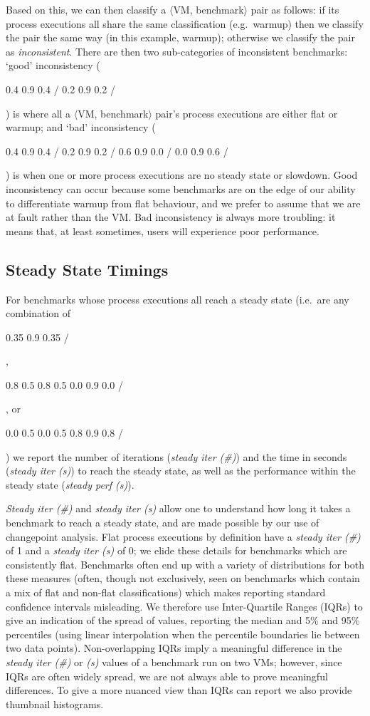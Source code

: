 \documentclass[acmsmall,screen]{acmart}
\newcommand{\vmbpair}{$\langle$VM, benchmark$\rangle$\xspace}
\DeclareRobustCommand{\flatc}{%
\setlength{\sparklinethickness}{0.4pt}%
\begin{sparkline}{1.5}
\spark 0.1 0.35
       0.9 0.35
       /%
\end{sparkline}\xspace%
}
\DeclareRobustCommand{\warmup}{%
\setlength{\sparklinethickness}{0.4pt}%
\begin{sparkline}{1.5}
\spark 0.1 0.8
       0.5 0.8
       0.5 0.0
       0.9 0.0
       /%
\end{sparkline}\xspace%
}
\DeclareRobustCommand{\slowdown}{%
\setlength{\sparklinethickness}{0.4pt}%
\begin{sparkline}{1.5}
\spark 0.1 0.0
       0.5 0.0
       0.5 0.8
       0.9 0.8
       /%
\end{sparkline}\xspace%
}
\DeclareRobustCommand{\badinconsistent}{%
\setlength{\sparklinethickness}{0.4pt}%
\begin{sparkline}{1.5}
\spark 0.1 0.4
       0.9 0.4
       /%
\spark 0.1 0.2
       0.9 0.2
       /%
\spark 0.1 0.6
       0.9 0.0
       /%
\spark 0.1 0.0
       0.9 0.6
       /%
\end{sparkline}\xspace%
}
\DeclareRobustCommand{\goodinconsistent}{%
\setlength{\sparklinethickness}{0.4pt}%
\begin{sparkline}{1.5}
\spark 0.1 0.4
       0.9 0.4
       /%
\spark 0.1 0.2
       0.9 0.2
       /%
\end{sparkline}\xspace%
}
\begin{document}
Based on this, we can then classify a \vmbpair pair as follows:
if its process executions all share the same classification (e.g.~warmup) then
we classify the pair the same way (in this example, warmup); otherwise we classify the pair as
\emph{inconsistent}. There are then two sub-categories of inconsistent
benchmarks: `good' inconsistency (\goodinconsistent) is where all a \vmbpair pair's process
executions are either flat or warmup; and `bad' inconsistency (\badinconsistent) is
when one or more process executions are no steady state or slowdown. Good inconsistency
can occur because some benchmarks are on the edge of our ability to differentiate warmup
from flat behaviour, and we prefer to assume that we are at fault rather
than the VM. Bad inconsistency is always more troubling: it
means that, at least sometimes, users will experience poor performance.


\subsection{Steady State Timings}
\label{sec:timings}

For benchmarks whose process executions all reach a steady state (i.e.~are
any combination of \flatc, \warmup, or \slowdown) we report the number of
iterations (\emph{steady iter (\#)}) and the time in seconds (\emph{steady iter (s)}) to
reach the steady state, as well as the performance within the steady
state (\emph{steady perf (s)}).

\emph{Steady iter (\#)} and \emph{steady iter (s)} allow one to understand how long it takes
a benchmark to reach a steady state, and are made possible by our use of changepoint
analysis. Flat process executions by definition have a \emph{steady iter (\#)} of 1 and
a \emph{steady iter (s)} of 0; we elide these details for benchmarks
which are consistently flat. Benchmarks often end up with a variety of distributions
for both these measures (often, though not exclusively, seen on benchmarks
which contain a mix of flat and non-flat classifications) which makes reporting standard confidence intervals
misleading. We therefore use Inter-Quartile Ranges (IQRs) to give an indication of the
spread of values, reporting the median and 5\% and 95\% percentiles (using
linear interpolation when the percentile boundaries lie between two data points).
Non-overlapping IQRs imply a meaningful difference in the \emph{steady iter (\#)} or
\emph{(s)} values of a benchmark run on two VMs; however, since IQRs are often
widely spread, we are not always able to prove meaningful differences. To give a more
nuanced view than IQRs can report we also provide thumbnail histograms.
\end{document}

